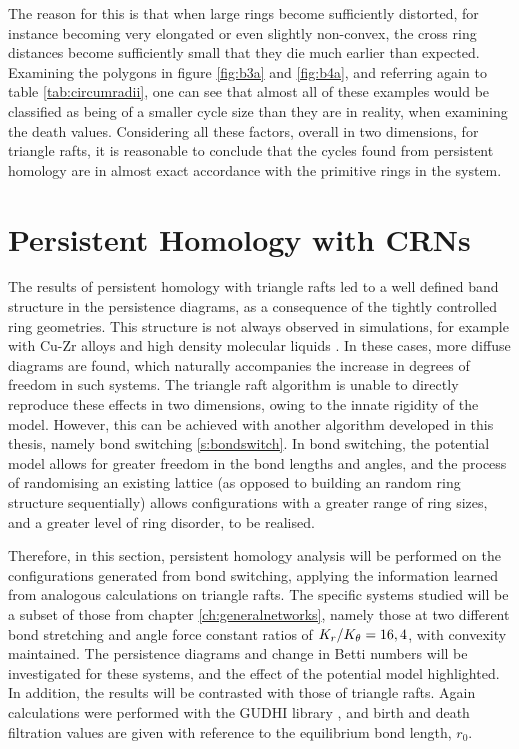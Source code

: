 The reason for this is that when large rings become sufficiently distorted, for instance becoming very elongated or even slightly non\--convex, the cross ring distances become sufficiently small that they die much earlier than expected.
Examining the polygons in figure \ref{fig:b3a} and \ref{fig:b4a}, and referring again to table \ref{tab:circumradii}, one can see that almost all of these examples would be classified as being of a smaller cycle size than they are in reality, when examining the death values.
Considering all these factors, overall in two dimensions, for triangle rafts, it is reasonable to conclude that the cycles found from persistent homology are in almost exact accordance with the primitive rings in the system.

\section{Persistent Homology with CRNs}

The results of persistent homology with triangle rafts led to a well defined band structure in the persistence diagrams, as a consequence of the tightly controlled ring geometries.
This structure is not always observed in simulations, for example with Cu\--Zr alloys and high density molecular liquids \cite{Hiraoka2016,Onodera2019}.
In these cases, more diffuse diagrams are found, which naturally accompanies the increase in degrees of freedom in such systems.
The triangle raft algorithm is unable to directly reproduce these effects in two dimensions, owing to the innate rigidity of the model.
However, this can be achieved with another algorithm developed in this thesis, namely bond switching \ref{s:bondswitch}.
In bond switching, the potential model allows for greater freedom in the bond lengths and angles, and the process of randomising an existing lattice (as opposed to building an random ring structure sequentially) allows configurations with a greater range of ring sizes, and a greater level of ring disorder, to be realised.

Therefore, in this section, persistent homology analysis will be performed on the configurations generated from bond switching, applying the information learned from analogous calculations on triangle rafts.
The specific systems studied will be a subset of those from chapter \ref{ch:generalnetworks}, namely those at two different bond stretching and angle force constant ratios of $K_r/K_\theta=16,4$, with convexity maintained.
The persistence diagrams and change in Betti numbers will be investigated for these systems, and the effect of the potential model highlighted.
In addition, the results will be contrasted with those of triangle rafts.
Again calculations were performed with the GUDHI library \cite{gudhi}, and birth and death filtration values are given with reference to the equilibrium bond length, $r_0$.

